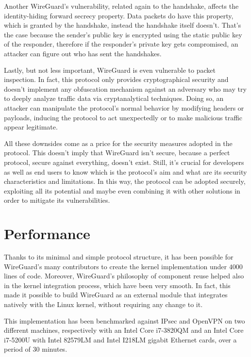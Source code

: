 \documentclass[light]{academica}
\begin{document}
Another WireGuard's vulnerability, related again to the handshake, affects the identity-hiding forward secrecy property.
Data packets do have this property, which is granted by the handshake, instead the handshake itself doesn't.
That's the case because the sender's public key is encrypted using the static public key of the responder, therefore if the responder's private key gets compromised, an attacker can figure out who has sent the handshakes.

Lastly, but not less important, WireGuard is even vulnerable to packet inspection.
In fact, this protocol only provides cryptographical security and doesn't implement any obfuscation mechanism against an adversary who may try to deeply analyze traffic data via cryptanalytical techniques.
Doing so, an attacker can manipulate the protocol's normal behavior by modifying headers or payloads, inducing the protocol to act unexpectedly or to make malicious traffic appear legitimate.

All these downsides come as a price for the security measures adopted in the protocol.
This doesn't imply that WireGuard isn't secure, because a perfect protocol, secure against everything, doesn't exist.
Still, it's crucial for developers as well as end users to know which is the protocol's aim and what are its security characteristics and limitations.
In this way, the protocol can be adopted securely, exploiting all its potential and maybe even combining it with other solutions in order to mitigate its vulnerabilities.

\chapter{Performance}\label{chap:performance}

Thanks to its minimal and simple protocol structure, it has been possible for WireGuard's many contributors to create the kernel implementation under $4000$ lines of code.
Moreover, WireGuard's philosophy of component reuse helped also in the kernel integration process, which have been very smooth.
In fact, this made it possible to build WireGuard as an external module that integrates natively with the Linux kernel, without requiring any change to it.

This implementation has been benchmarked against IPsec and OpenVPN on two different machines, respectively with an Intel Core i7-3820QM and an Intel Core i7-5200U with Intel 82579LM and Intel I218LM gigabit Ethernet cards, over a period of 30 minutes.
\end{document}
